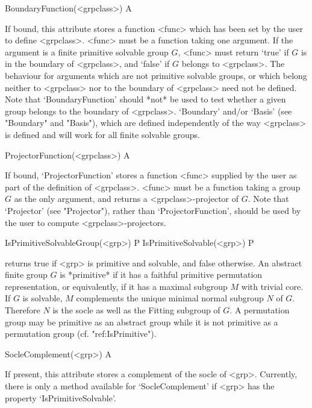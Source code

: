 \>BoundaryFunction(<grpclass>) A

If bound, this attribute stores a function <func> which has been set by the 
user to define <grpclass>. <func> must be a function taking one argument.
If the argument is a finite primitive solvable group $G$, <func> must  return 
`true' if $G$ is in the boundary of <grpclass>, and `false' if $G$ belongs to 
<grpclass>. The behaviour for arguments which are not primitive 
solvable groups, or which  belong neither to <grpclass> nor to the 
boundary of <grpclass> need not be defined. Note that 
`BoundaryFunction' should *not* be used to test whether a given group 
belongs to the boundary of <grpclass>. `Boundary' and/or `Basis' (see 
"Boundary" and "Basis"), which are defined independently of the way 
<grpclass> is defined and will work for all finite solvable groups.


\>ProjectorFunction(<grpclass>) A

If bound, `ProjectorFunction' stores a function <func> supplied by the
user as part of the definition of <grpclass>. <func> must be a function
taking a group
$G$ as the only argument, and returns a <grpclass>-projector of $G$.  Note that
`Projector' (see "Projector"),
rather than `ProjectorFunction', should be used by the user to compute
<grpclass>-projectors.


\null


\>IsPrimitiveSolvableGroup(<grp>) P
\>IsPrimitiveSolvable(<grp>) P

returns true if <grp> is primitive and solvable, and false otherwise.
An abstract finite group $G$ is *primitive* if it has a faithful primitive permutation 
representation, or equivalently, if it has a maximal subgroup $M$ with trivial 
core. If $G$ is solvable, $M$ complements the unique minimal normal subgroup
$N$ of $G$. Therefore $N$ is the socle as well as the Fitting subgroup of
$G$. A permutation group may be primitive as an abstract group while it is 
not primitive as a permutation group (cf. "ref:IsPrimitive").


\>SocleComplement(<grp>) A

If present, this attribute stores a complement of the socle of <grp>.
Currently, there is only a method available for `SocleComplement'
if <grp> has the property `IsPrimitiveSolvable'.



